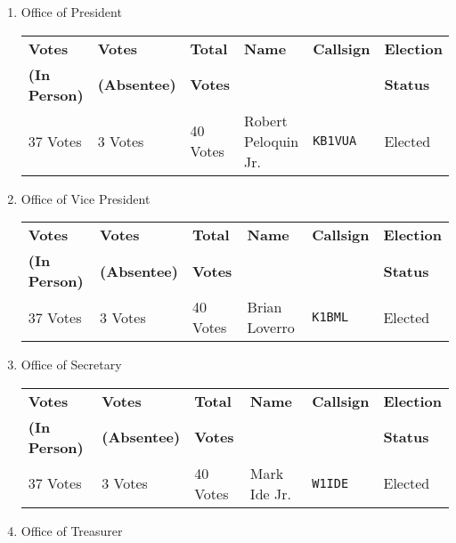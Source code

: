\documentclass[10pt,letterpaper]{article}
\begin{document}
\begin{enumerate}
  \item Office of President

  \begin{tabular}{|p{1in}|p{.75in}|p{.6in}|p{1.2in}|p{.75in}|p{.75in}|}
  \hline
  \textbf{Votes}       & \textbf{Votes}      & \textbf{Total} & \textbf{Name} & \textbf{Callsign} & \textbf{Election} \\
  \textbf{(In Person)} & \textbf{(Absentee)} & \textbf{Votes} &               &                   & \textbf{Status}   \\ \hline
  37 Votes & 3 Votes & 40 Votes & Robert Peloquin Jr. & \texttt{KB1VUA} & Elected \\ \hline
  \end{tabular}

  \item Office of Vice President

  \begin{tabular}{|p{1in}|p{.75in}|p{.6in}|p{1.2in}|p{.75in}|p{.75in}|}
  \hline
  \textbf{Votes}       & \textbf{Votes}      & \textbf{Total} & \textbf{Name} & \textbf{Callsign} & \textbf{Election} \\
  \textbf{(In Person)} & \textbf{(Absentee)} & \textbf{Votes} &               &                   & \textbf{Status}   \\ \hline
  37 Votes & 3 Votes & 40 Votes & Brian Loverro & \texttt{K1BML} & Elected \\ \hline
  \end{tabular}

  \item Office of Secretary

  \begin{tabular}{|p{1in}|p{.75in}|p{.6in}|p{1.2in}|p{.75in}|p{.75in}|}
  \hline
  \textbf{Votes}       & \textbf{Votes}      & \textbf{Total} & \textbf{Name} & \textbf{Callsign} & \textbf{Election} \\
  \textbf{(In Person)} & \textbf{(Absentee)} & \textbf{Votes} &               &                   & \textbf{Status}   \\ \hline
  37 Votes & 3 Votes & 40 Votes & Mark Ide Jr. & \texttt{W1IDE} & Elected \\ \hline
  \end{tabular}

  \item Office of Treasurer


\end{enumerate}
\end{document}
